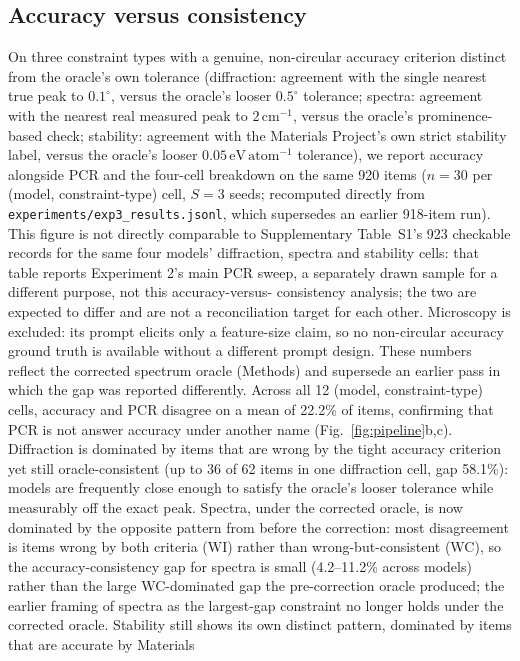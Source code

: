 \documentclass[pdflatex,sn-nature]{sn-jnl}
\begin{document}
\subsection*{Accuracy versus consistency}
On three constraint types with a genuine, non-circular accuracy criterion distinct
from the oracle's own tolerance (diffraction: agreement with the single nearest true
peak to $0.1^{\circ}$, versus the oracle's looser $0.5^{\circ}$ tolerance; spectra:
agreement with the nearest real measured peak to $2\,\mathrm{cm}^{-1}$, versus the
oracle's prominence-based check; stability: agreement with the Materials Project's own
strict stability label, versus the oracle's looser $0.05\,\mathrm{eV\,atom^{-1}}$
tolerance), we report accuracy alongside PCR and the four-cell breakdown on the same
920 items ($n=30$ per (model, constraint-type) cell, $S=3$ seeds; recomputed directly from
\texttt{experiments/exp3\_results.jsonl}, which supersedes an earlier 918-item run). This
figure is not directly comparable to Supplementary Table~S1's 923 checkable records for the
same four models' diffraction, spectra and stability cells: that table reports Experiment 2's
main PCR sweep, a separately drawn sample for a different purpose, not this accuracy-versus-
consistency analysis; the two are expected to differ and are not a reconciliation target for
each other. Microscopy is excluded: its
prompt elicits only a feature-size claim, so no non-circular accuracy ground truth is
available without a different prompt design. These numbers reflect the corrected
spectrum oracle (Methods) and supersede an earlier pass in which the gap was reported
differently. Across all 12 (model, constraint-type) cells,
accuracy and PCR disagree on a mean of 22.2\% of items, confirming that PCR is not
answer accuracy under another name (Fig.~\ref{fig:pipeline}b,c). Diffraction is dominated by items
that are wrong by the tight accuracy criterion yet still oracle-consistent (up to 36
of 62 items in one diffraction cell, gap 58.1\%): models are frequently close enough to satisfy the
oracle's looser tolerance while measurably off the exact peak. Spectra, under the corrected
oracle, is now dominated by the opposite pattern from before the correction: most
disagreement is items wrong by both criteria (WI) rather than wrong-but-consistent (WC),
so the accuracy-consistency gap for spectra is small (4.2--11.2\% across models) rather
than the large WC-dominated gap the pre-correction oracle produced; the earlier framing of
spectra as the largest-gap constraint no longer holds under the corrected oracle. Stability
still shows its own distinct pattern, dominated by items that are accurate by Materials
\end{document}
